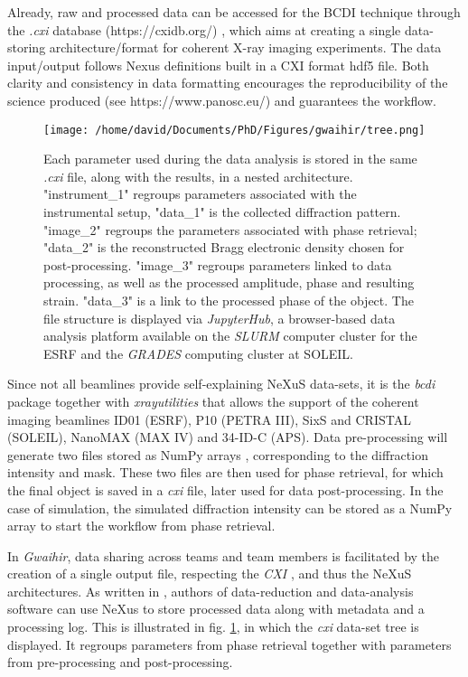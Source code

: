 Already, raw and processed data can be accessed for the BCDI technique through the \textit{.cxi} database (https://cxidb.org/) \parencite{Maia2012}, which aims at creating a single data-storing architecture/format for coherent X-ray imaging experiments.
The data input/output follows Nexus definitions \parencite{Konnecke2015} built in a CXI format hdf5 file.
Both clarity and consistency in data formatting encourages the reproducibility of the science produced (see https://www.panosc.eu/) and guarantees the workflow.

\begin{figure}[!htb]
    \centering
    \texttt{[image: /home/david/Documents/PhD/Figures/gwaihir/tree.png]}
    \caption{
    Each parameter used during the data analysis is stored in the same \textit{.cxi} file, along with the results, in a  nested architecture.
    "instrument\_1" regroups parameters associated with the instrumental setup, "data\_1" is the collected diffraction pattern.
    "image\_2" regroups the parameters associated with phase retrieval; "data\_2" is the reconstructed Bragg electronic density chosen for post-processing.
    "image\_3" regroups parameters linked to data processing, as well as the processed amplitude, phase and resulting strain. "data\_3" is a link to the processed phase of the object.
    The file structure is displayed via \textit{JupyterHub}, a browser-based data analysis platform available on the \textit{SLURM} computer cluster for the ESRF and the \textit{GRADES} computing cluster at SOLEIL.
    }
    \label{fig:TREE}
\end{figure}

Since not all beamlines provide self-explaining NeXuS data-sets, it is the \textit{bcdi} package together with \textit{xrayutilities} \cite{kriegner_xrayutilities_2013} that allows the support of the coherent imaging beamlines ID01 (ESRF), P10 (PETRA III), SixS and CRISTAL (SOLEIL), NanoMAX (MAX IV) and 34-ID-C (APS).
Data pre-processing will generate two files stored as NumPy arrays \cite{NumPy}, corresponding to the diffraction intensity and mask.
These two files are then used for phase retrieval, for which the final object is saved in a \textit{cxi} file, later used for data post-processing.
In the case of simulation, the simulated diffraction intensity can be stored as a NumPy array to start the workflow from phase retrieval.

In \textit{Gwaihir}, data sharing across teams and team members is facilitated by the creation of a single output file, respecting the \textit{CXI} \cite{Maia2012}, and thus the NeXuS \cite{Konnecke2015} architectures.
As written in \cite{Konnecke2015}, authors of data-reduction and data-analysis software can use NeXus to store processed data along with metadata and a processing log. This is illustrated in fig. \ref{fig:TREE}, in which the \textit{cxi} data-set tree is displayed. It regroups parameters from phase retrieval together with parameters from pre-processing and post-processing.

